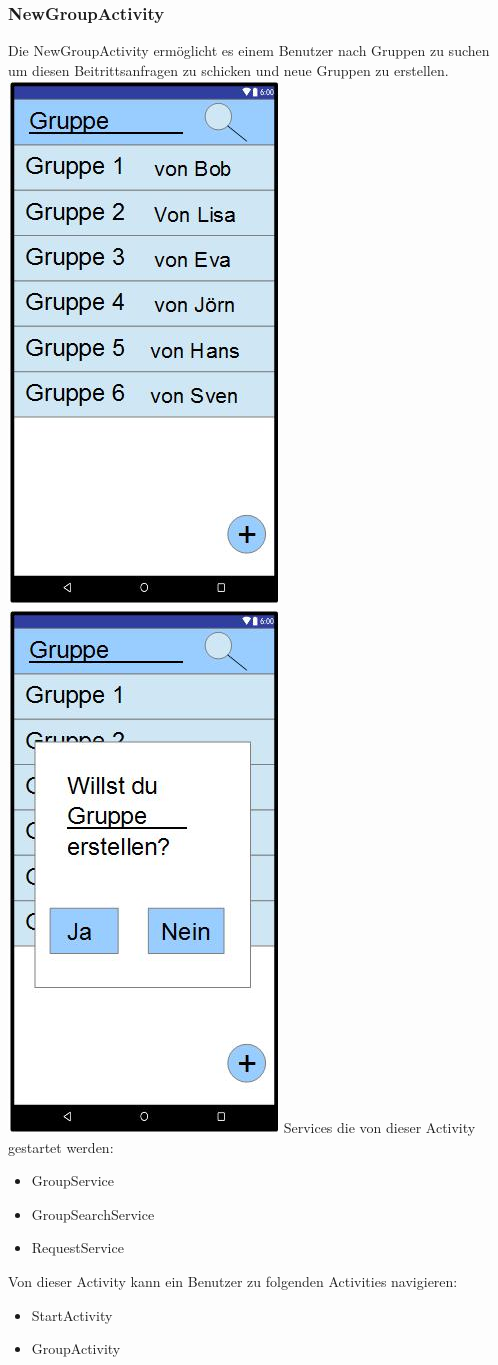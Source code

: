 	\subsubsection {NewGroupActivity}
	Die NewGroupActivity ermöglicht es einem Benutzer nach Gruppen zu suchen um diesen Beitrittsanfragen zu schicken und neue Gruppen zu erstellen.
	\newline
	\includegraphics[width=.3\textwidth]{GUI_NeueGruppe.jpg}
	\includegraphics[width=.3\textwidth]{GUI_GruppeNeuBest.jpg}
	\newline
	Services die von dieser Activity gestartet werden:
	\begin{itemize}
	\item GroupService
	\item GroupSearchService
	\item RequestService
	\end{itemize}
	Von dieser Activity kann ein Benutzer zu folgenden Activities navigieren:
	\begin{itemize} 
	 \item StartActivity
	 \item GroupActivity
	 \end{itemize}
	 \newpage
